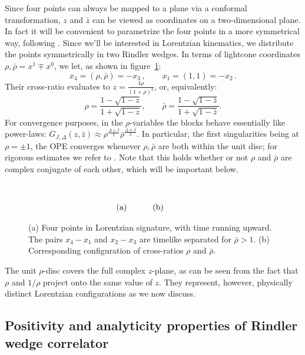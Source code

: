 \documentclass[11pt, reqno,preprint]{article}
\def\be{\begin{equation}}
\def\ee{\end{equation}}
\def\rhobar{\bar{\rho}}
\def\zbar{\bar{z}}
\def\j{J}
\begin{document}
Since four points can always be mapped to a plane via a conformal transformation,
$z$ and $\zbar$ can be viewed as coordinates on a two-dimensional plane.
In fact it will be convenient to parametrize the four points in a more symmetrical way,
following \cite{Hogervorst:2013sma}.  Since we'll be interested in Lorentzian kinematics,
we distribute the points symmetrically in two Rindler wedges.
In terms of lightcone coordinates $\rho,\rhobar=x^1\mp x^0$, we let, as shown in figure~\ref{fig:rindler}:
\be
  x_4=(\rho,\rhobar)=-x_3\,,\qquad  x_1=(1,1) = -x_2\,.
\ee
Their cross-ratio evaluates to $z=\frac{4\rho}{(1+\rho)^2}$, or, equivalently:
\be
 \rho = \frac{1-\sqrt{1-z}}{1+\sqrt{1-z}},\qquad
 \rhobar = \frac{1-\sqrt{1-\zbar}}{1+\sqrt{1-\zbar}}. \label{rhorhobar}
\ee
For convergence purposes, in the $\rho$-variables
the blocks behave essentially like power-laws: $G_{\j,\Delta}(z,\zbar)
\approx \rho^{\frac{\Delta\pm \j}{2}}\rhobar^{\frac{\Delta\mp \j}{2}}$.
In particular, the first singularities being at $\rho=\pm 1$,
the OPE converges whenever $\rho,\rhobar$ are both within the unit disc;
for rigorous estimates we refer to \cite{Pappadopulo:2012jk}.
Note that this holds whether or not $\rho$ and $\rhobar$ are complex conjugate of each other, which will be important below.

\begin{figure}
\be\begin{array}{cc}
\hspace{6mm}\def\svgwidth{80mm}
&
\hspace{6mm}\def\svgwidth{70mm}
\\
\\ \hspace{-17mm}\mbox{(a)}&\hspace{-5mm}\mbox{(b)}
\end{array}\nonumber\ee
\caption{(a) Four points in Lorentzian signature, with time running upward.  The pairs $x_4-x_1$ and $x_2-x_3$ are timelike separated
for $\rhobar>1$.
(b) Corresponding configuration of cross-ratios $\rho$ and $\rhobar$.
}
\label{fig:rindler}
\end{figure}

The unit $\rho$-disc covers the full complex $z$-plane, as can be seen from the fact that
$\rho$ and $1/\rho$ project onto the same value of $z$. They represent, however, physically distinct Lorentzian configurations as we now discuss.

\subsection{Positivity and analyticity properties of Rindler wedge correlator}
\end{document}
